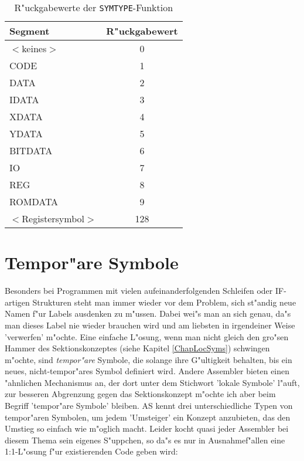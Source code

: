 \documentclass[12pt,a4paper,twoside]{report}
\newcommand{\tty}[1]{{\tt #1}}
\begin{document}
\begin{table}[htb]
\begin{center}
\begin{tabular}{|l|c|}
\hline
Segment & R"uckgabewert \\
\hline
$<$keines$>$ & 0 \\
CODE & 1 \\
DATA & 2 \\
IDATA & 3 \\
XDATA & 4 \\
YDATA & 5 \\
BITDATA & 6 \\
IO & 7 \\
REG & 8 \\
ROMDATA & 9 \\
$<$Registersymbol$>$ & 128 \\
\hline
\end{tabular}
\end{center}
\caption{R"uckgabewerte der \tty{SYMTYPE}-Funktion\label{TabSegNums}}
\end{table}


\section{Tempor"are Symbole}

Besonders bei Programmen mit vielen aufeinanderfolgenden Schleifen oder
IF-artigen Strukturen steht man immer wieder vor dem Problem, sich
st"andig neue Namen f"ur Labels ausdenken zu m"ussen.  Dabei wei"s man an
sich genau, da"s man dieses Label nie wieder brauchen wird und am liebsten
in irgendeiner Weise 'verwerfen' m"ochte.  Eine einfache L"osung, wenn man
nicht gleich den gro"sen Hammer des Sektionskonzeptes (siehe Kapitel
\ref{ChapLocSyms}) schwingen m"ochte, sind {\em tempor"are} Symbole, die
solange ihre G"ultigkeit behalten, bis ein neues, nicht-tempor"ares Symbol
definiert wird.  Andere Assembler bieten einen "ahnlichen Mechanismus an,
der dort unter dem Stichwort 'lokale Symbole' l"auft, zur besseren
Abgrenzung gegen das Sektionskonzept m"ochte ich aber beim Begriff
'tempor"are Symbole' bleiben.  AS kennt drei unterschiedliche Typen von
tempor"aren Symbolen, um jedem 'Umsteiger' ein Konzept anzubieten, das den
Umstieg so einfach wie m"oglich macht.  Leider kocht quasi jeder Assembler
bei diesem Thema sein eigenes S"uppchen, so da"s es nur in Ausnahmef"allen
eine 1:1-L"osung f"ur existierenden Code geben wird:
\end{document}
